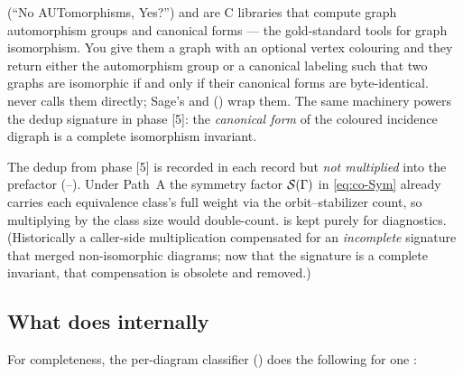 \begin{note}
 (``No AUTomorphisms, Yes?'') and  are C libraries that
compute graph automorphism groups and canonical forms --- the gold-standard tools
for graph isomorphism. You give them a graph with an optional vertex colouring and
they return either the automorphism group or a canonical labeling such that two
graphs are isomorphic if and only if their canonical forms are byte-identical.
\Daedalus{} never calls them directly; Sage's 
and  () wrap
them. The same machinery powers the dedup signature in phase [5]: the
\emph{canonical form} of the coloured incidence digraph is a complete isomorphism
invariant.
\end{note}

\begin{gotcha}
The dedup  from phase [5] is recorded in each record but
\emph{not multiplied} into the prefactor (--).
Under Path~A the symmetry factor $\mathcal{S}(\Gamma)$ in \eqref{eq:co-Sym} already
carries each equivalence class's full weight via the orbit--stabilizer count, so
multiplying by the class size would double-count.  is kept
purely for diagnostics. (Historically a caller-side multiplication compensated for
an \emph{incomplete} signature that merged non-isomorphic diagrams; now that the
signature is a complete invariant, that compensation is obsolete and removed.)
\end{gotcha}

\subsection{What  does internally}

For completeness, the per-diagram classifier ()
does the following for one :

